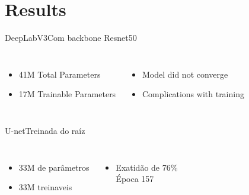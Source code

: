 \section{Results}


\begin{frame}[c]{DeepLabV3}{Com backbone Resnet50}

    \begin{columns}
            \begin{itemize}
                  \item 41M Total Parameters
                  \item 17M Trainable Parameters
            \end{itemize}
            \begin{itemize}
                  \item Model did not converge
                  \item Complications with training
            \end{itemize}
    \end{columns}

    
  \end{frame}


\begin{frame}[c]{U-net}{Treinada do raíz}

  \begin{columns}

      \begin{itemize}
            \item 33M de parâmetros
            \item 33M treinaveis
      \end{itemize}

    \begin{itemize}
      \item Exatidão de 76\% \\Época 157
    \end{itemize}


  \end{columns}

\end{frame}

\newcommand{\plotA}{\inserttrainvalplot{resources/data/train_info_unet_200_smooth.csv}{ylabel=Loss, xmin=0, xmax=157, ymin=0, ymax=2, title=U-Net from scratch - Smoothed losses}{Train losses}{Validation losses}{north east}}
\newcommand{\plotB}{\inserttrainvalplot{resources/data/train_info_unet_200_smooth.csv}{ylabel=DICE Score, xmin=0, xmax=157, ymin=0, ymax=1, title=U-Net from scratch - Smoothed DICE scores}{Train DICE}{Validation DICE}{north west}}

